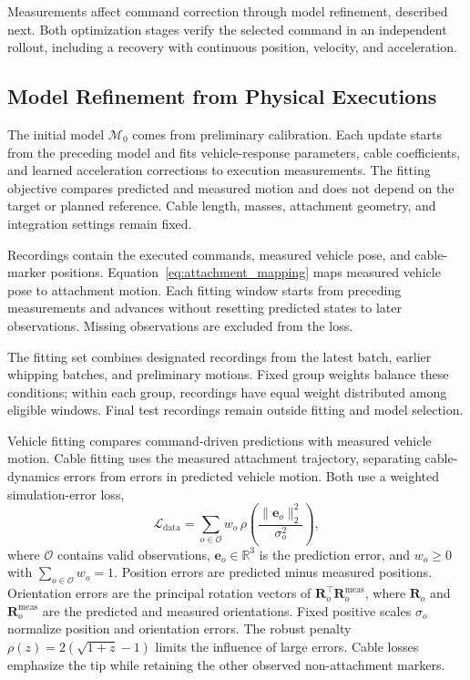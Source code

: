 \documentclass[letterpaper, 10 pt, conference]{ieeeconf}
\begin{document}
Measurements affect command correction through model refinement,
described next. Both optimization stages verify the selected command
in an independent rollout, including a recovery with continuous
position, velocity, and acceleration.

\subsection{Model Refinement from Physical Executions}
\label{subsec:model_refinement}

The initial model $\mathcal M_0$ comes from preliminary calibration.
Each update starts from the preceding model and fits vehicle-response
parameters, cable coefficients, and learned acceleration corrections
to execution measurements. The fitting objective compares predicted and measured motion and does not
depend on the target or planned reference. Cable length, masses,
attachment geometry, and integration settings remain fixed.

Recordings contain the executed commands, measured vehicle pose,
and cable-marker positions. Equation~\eqref{eq:attachment_mapping}
maps measured vehicle pose to attachment motion. Each fitting
window starts from preceding measurements and advances without
resetting predicted states to later observations. Missing
observations are excluded from the loss.

The fitting set combines designated recordings from the latest
batch, earlier whipping batches, and preliminary motions.
Fixed group weights balance these conditions; within each group,
recordings have equal weight distributed among eligible windows.
Final test recordings remain outside fitting and model selection.

Vehicle fitting compares command-driven predictions with measured
vehicle motion. Cable fitting uses the measured attachment
trajectory, separating cable-dynamics errors from errors in
predicted vehicle motion. Both use a weighted simulation-error loss,
\begin{equation}
\mathcal L_{\mathrm{data}}
=\sum_{o\in\mathcal O}w_o\,\rho\!\left(\frac{\|\mathbf e_o\|_2^2}{\sigma_o^2}\right),
\label{eq:refinement_data_loss}
\end{equation}
where $\mathcal O$ contains valid observations,
$\mathbf e_o\in\mathbb R^3$ is the prediction error, and
$w_o\geq0$ with $\sum_{o\in\mathcal O}w_o=1$.
Position errors are predicted minus measured positions.
Orientation errors are the principal rotation vectors of
$\mathbf R_o^\top\mathbf R_o^{\mathrm{meas}}$, where
$\mathbf R_o$ and $\mathbf R_o^{\mathrm{meas}}$ are the
predicted and measured orientations.
Fixed positive scales $\sigma_o$ normalize position and
orientation errors. The robust penalty
$\rho(z)=2(\sqrt{1+z}-1)$ limits the influence of large errors.
Cable losses emphasize the tip while retaining the other observed
non-attachment markers.
\end{document}
